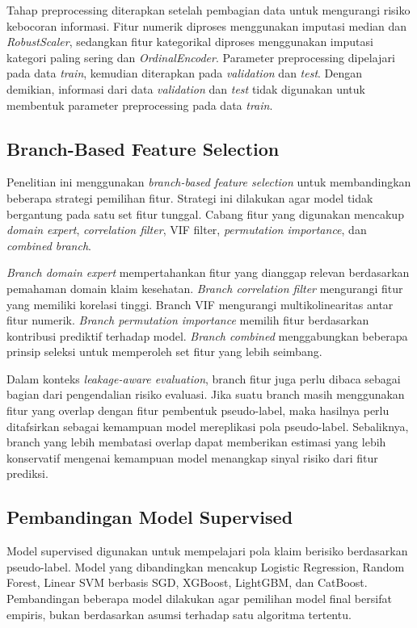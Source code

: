 Tahap preprocessing diterapkan setelah pembagian data untuk mengurangi risiko kebocoran informasi. Fitur numerik diproses menggunakan imputasi median dan \emph{RobustScaler}, sedangkan fitur kategorikal diproses menggunakan imputasi kategori paling sering dan \emph{OrdinalEncoder}. Parameter preprocessing dipelajari pada data \emph{train}, kemudian diterapkan pada \emph{validation} dan \emph{test}. Dengan demikian, informasi dari data \emph{validation} dan \emph{test} tidak digunakan untuk membentuk parameter preprocessing pada data \emph{train}.

\subsection{Branch-Based Feature Selection}\label{branch-based-feature-selection}

Penelitian ini menggunakan \emph{branch-based feature selection} untuk membandingkan beberapa strategi pemilihan fitur. Strategi ini dilakukan agar model tidak bergantung pada satu set fitur tunggal. Cabang fitur yang digunakan mencakup \emph{domain expert}, \emph{correlation filter}, VIF filter, \emph{permutation importance}, dan \emph{combined branch}.

\emph{Branch domain expert} mempertahankan fitur yang dianggap relevan berdasarkan pemahaman domain klaim kesehatan. \emph{Branch correlation filter} mengurangi fitur yang memiliki korelasi tinggi. Branch VIF mengurangi multikolinearitas antar fitur numerik. \emph{Branch permutation importance} memilih fitur berdasarkan kontribusi prediktif terhadap model. \emph{Branch combined} menggabungkan beberapa prinsip seleksi untuk memperoleh set fitur yang lebih seimbang.

Dalam konteks \emph{leakage-aware evaluation}, branch fitur juga perlu dibaca sebagai bagian dari pengendalian risiko evaluasi. Jika suatu branch masih menggunakan fitur yang overlap dengan fitur pembentuk pseudo-label, maka hasilnya perlu ditafsirkan sebagai kemampuan model mereplikasi pola pseudo-label. Sebaliknya, branch yang lebih membatasi overlap dapat memberikan estimasi yang lebih konservatif mengenai kemampuan model menangkap sinyal risiko dari fitur prediksi.

\subsection{Pembandingan Model Supervised}\label{pembandingan-model-supervised}

Model supervised digunakan untuk mempelajari pola klaim berisiko berdasarkan pseudo-label. Model yang dibandingkan mencakup Logistic Regression, Random Forest, Linear SVM berbasis SGD, XGBoost, LightGBM, dan CatBoost. Pembandingan beberapa model dilakukan agar pemilihan model final bersifat empiris, bukan berdasarkan asumsi terhadap satu algoritma tertentu.

